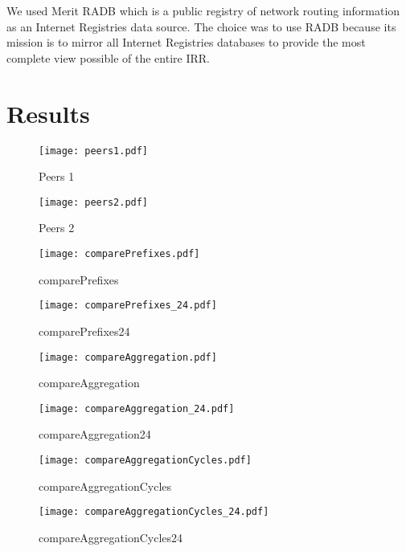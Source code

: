 \documentclass[11pt]{report}
\begin{document}
We used Merit RADB \cite{RADB} which is a public registry of network routing information as an Internet Registries data source. The choice was to use RADB because its mission is to mirror all Internet Registries  databases to provide the most complete view possible of the entire IRR. 

\section{Results}

\begin{figure}[h!]
\centering
\texttt{[image: peers1.pdf]}
\caption{Peers 1}
\label{fig:peers1}
\end{figure}

\begin{figure}[h!]
\centering
\texttt{[image: peers2.pdf]}
\caption{Peers 2}
\label{fig:peers2}
\end{figure}

\begin{figure}[h!]
\centering
\texttt{[image: comparePrefixes.pdf]}
\caption{comparePrefixes}
\label{fig:comparePrefixes}
\end{figure}

\begin{figure}[h!]
\centering
\texttt{[image: comparePrefixes\_24.pdf]}
\caption{comparePrefixes24}
\label{fig:comparePrefixes_24}
\end{figure}

\begin{figure}[h!]
\centering
\texttt{[image: compareAggregation.pdf]}
\caption{compareAggregation}
\label{fig:compareAggregation}
\end{figure}

\begin{figure}[h!]
\centering
\texttt{[image: compareAggregation\_24.pdf]}
\caption{compareAggregation24}
\label{fig:compareAggregation24}
\end{figure}

\begin{figure}[h!]
\centering
\texttt{[image: compareAggregationCycles.pdf]}
\caption{compareAggregationCycles}
\label{fig:compareAggregationCycles}
\end{figure}

\begin{figure}[h!]
\centering
\texttt{[image: compareAggregationCycles\_24.pdf]}
\caption{compareAggregationCycles24}
\label{fig:compareAggregationCycles24}
\end{figure}
\end{document}
